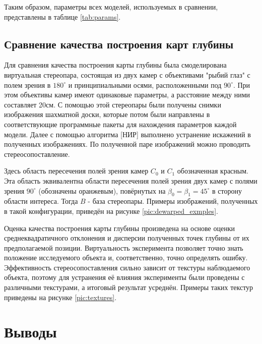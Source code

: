 Таким образом, параметры всех моделей, используемых в сравнении, представлены в таблице \ref{tab:params}.


\subsection{Сравнение качества построения карт глубины}

Для сравнения качества построения карты глубины была смоделирована виртуальная стереопара, состоящая из двух камер с объективами 
"рыбий глаз" с полем зрения в $180^\circ$ и принципиальными осями, расположенными под $90^\circ$. При этом объективы камер имеют 
одинаковые параметры, а расстояние между ними составляет 20см. С помощью этой стереопары были получены снимки изображения шахматной доски, 
которые потом были направлены в соответствующие программные пакеты для нахождения параметров каждой модели. Далее с помощью алгоритма [НИР]				%
выполнено устранение искажений в полученных изображениях. По полученной паре изображений можно проводить стереосопоставление. 


Здесь область пересечения полей зрения камер $C_0$ и $C_1$ обозначенная красным.
Эта область эквивалентна области пересечения полей зрения двух камер с полями зрения $90^\circ$ (обозначены
оранжевым), повёрнутых на $\beta_0 = \beta_1  = 45^\circ$ в сторону области интереса. Тогда $B$ - база стереопары.
Примеры изображений, полученных в такой конфигурации, приведён на рисунке \ref{pic:dewarped_exmples}. 



Оценка качества построения карты глубины произведена на основе оценки среднеквадратичного отклонения и дисперсии полученных точек 
глубины от их предполагаемой позиции. Виртуальность эксперимента позволяет точно знать положение исследуемого объекта и, соответственно, 
точно определять ошибку. Эффективность стереосопоставления \cite{SGBM} сильно зависит от текстуры наблюдаемого объекта, поэтому для устранения 
её влияния эксперименты были проведены с различными текстурами, а итоговый результат усреднён. Примеры таких текстур приведены на рисунке \ref{pic:textures}. 


\section{Выводы}
\label{conclusion}


\newpage




